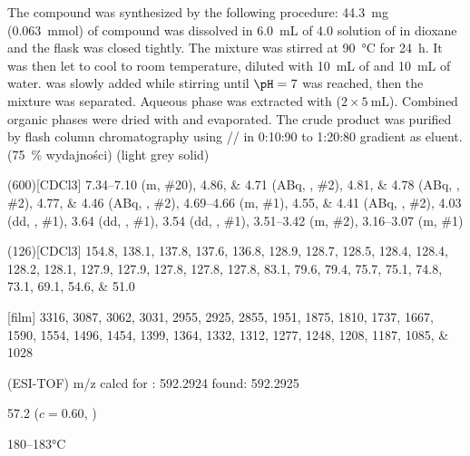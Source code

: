 The compound was synthesized by the following procedure:
\SI{44.3}{\milli\gram} (\SI{0.063}{\milli\mol}) of compound  was dissolved in \SI{6.0}{\milli\liter} of \SI{4.0}{\Molar} solution of  in dioxane and the flask was closed tightly.
The mixture was stirred at \SI{90}{\degreeCelsius} for \SI{24}{\hour}.
It was then let to cool to room temperature, diluted with \SI{10}{\milli\liter} of  and \SI{10}{\milli\liter} of water.
 was slowly added while stirring until $\pH = 7$ was reached, then the mixture was separated.
Aqueous phase was extracted with  ($2 \times \SI{5}{\milli\liter}$).
Combined organic phases were dried with  and evaporated.
The crude product was purified by flash column chromatography using // in 0:10:90 to 1:20:80 gradient as eluent.
(\SI{75}{\percent} wydajności) (light grey solid)
\begin{fullexp}
	\NMR(600)[CDCl3] \numrange{7.34}{7.10} (m, \#{20}), \numlist{4.86;4.71} (ABq, , \#{2}), \numlist{4.81;4.78} (ABq, , \#{2}), \numlist{4.77;4.46} (ABq, , \#{2}), \numrange{4.69}{4.66} (m, \#{1}), \numlist{4.55;4.41} (ABq, , \#{2}), \num{4.03} (dd, , \#{1}), \num{3.64} (dd, , \#{1}), \num{3.54} (dd, , \#{1}), \numrange{3.51}{3.42} (m, \#{2}), \numrange{3.16}{3.07} (m, \#{1})\par\noindent
	(126)[CDCl3] \numlist{154.8; 138.1; 137.8; 137.6; 136.8; 128.9; 128.7; 128.5; 128.4; 128.4; 128.2; 128.1; 127.9; 127.9; 127.8; 127.8; 127.8; 83.1; 79.6; 79.4; 75.7; 75.1; 74.8; 73.1; 69.1; 54.6; 51.0}\par\noindent
	[film] \numlist{3316; 3087; 3062; 3031; 2955; 2925; 2855; 1951; 1875; 1810; 1737; 1667; 1590; 1554; 1496; 1454; 1399; 1364; 1332; 1312; 1277; 1248; 1208; 1187; 1085; 1028}\par\noindent
	 (ESI-TOF) m/z calcd for : \num{592.2924} found: \num{592.2925}\par\noindent
	\data{[$\alpha^{23}_D$]~$=$} \num{57.2} ($c = 0.60$, )\par\noindent
	 \numrange{180}{183}\si{\celsius}
\end{fullexp}
